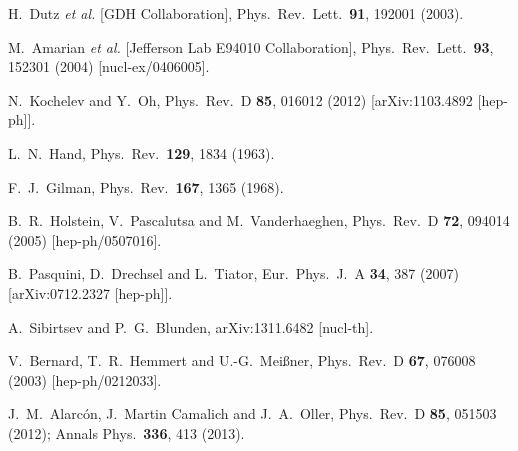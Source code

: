 \documentclass[prc,twocolumn,showpacs,preprintnumbers,amsmath,amssymb
,superscriptaddress,a4paper,nofootinbib
]{revtex4-1}
\begin{document}
\begin{thebibliography}{99}
  H.~Dutz {\it et al.}  [GDH Collaboration],
  Phys.\ Rev.\ Lett.\  {\bf 91}, 192001 (2003).

  M.~Amarian {\it et al.}  [Jefferson Lab E94010 Collaboration],
  Phys.\ Rev.\ Lett.\  {\bf 93}, 152301 (2004)
  [nucl-ex/0406005].


  N.~Kochelev and Y.~Oh,
  Phys.\ Rev.\ D {\bf 85}, 016012 (2012)
  [arXiv:1103.4892 [hep-ph]].



  L.~N.~Hand,
  Phys.\ Rev.\  {\bf 129}, 1834 (1963).

  F.~J.~Gilman,
  Phys.\ Rev.\  {\bf 167}, 1365 (1968).
  
  B.~R.~Holstein, V.~Pascalutsa and M.~Vanderhaeghen,
  Phys.\ Rev.\ D {\bf 72}, 094014 (2005)
  [hep-ph/0507016].
  
  B.~Pasquini, D.~Drechsel and L.~Tiator,
  Eur.\ Phys.\ J.\ A {\bf 34}, 387 (2007)
  [arXiv:0712.2327 [hep-ph]].
  
  A.~Sibirtsev and P.~G.~Blunden,
  arXiv:1311.6482 [nucl-th].


  V.~Bernard, T.~R.~Hemmert and U.-G.~Mei\ss ner,
  Phys.\ Rev.\ D {\bf 67}, 076008 (2003)
  [hep-ph/0212033].

  J.~M.~Alarc\'on, J.~Martin Camalich and J.~A.~Oller,
    Phys.\ Rev.\ D {\bf 85}, 051503 (2012);  Annals Phys.\  {\bf 336}, 413 (2013).
  

\end{thebibliography}
\end{document}
